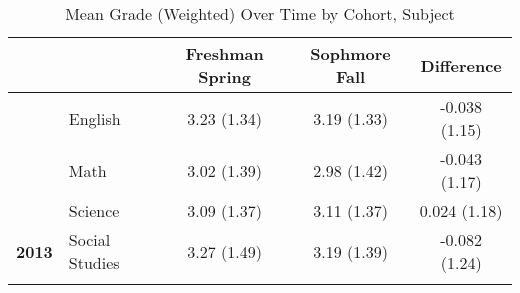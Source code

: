 \begin{table}[!h]

\caption{\label{tab:table_grade_desc}Mean Grade (Weighted) Over Time by Cohort, Subject}
\centering
\begin{tabular}[t]{>{}llccc}
\toprule{}
 &  & Freshman Spring & Sophmore Fall & Difference\\
\midrule{}
 & English & 3.23 (1.34) & 3.19 (1.33) & -0.038 (1.15)\\

 & Math & 3.02 (1.39) & 2.98 (1.42) & -0.043 (1.17)\\

 & Science & 3.09 (1.37) & 3.11 (1.37) & 0.024 (1.18)\\

\multirow{-4}{*}{\raggedright\arraybackslash \textbf{2013}} & Social Studies & 3.27 (1.49) & 3.19 (1.39) & -0.082 (1.24)\\
\bottomrule{}
\end{tabular}
\end{table}
